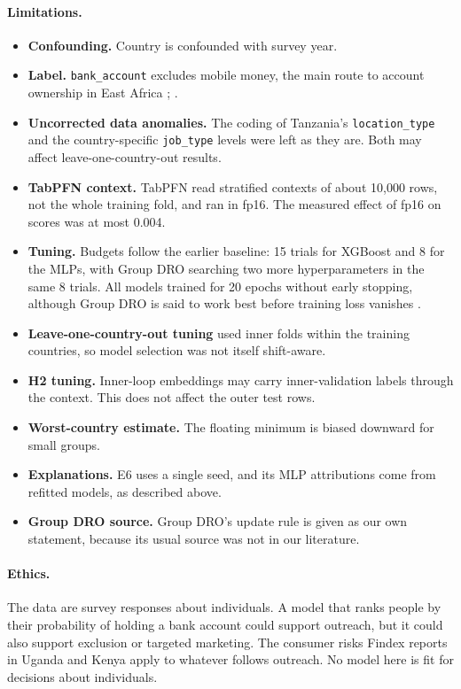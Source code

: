 \documentclass[11pt]{article}
\begin{document}
\paragraph{Limitations.}
\begin{itemize}
  \item \textbf{Confounding.} Country is confounded with survey year.
  \item \textbf{Label.} \texttt{bank\_account} excludes mobile money, the main route to account ownership in East Africa \citep[p.~20]{demirguckunt2022findex}; \citep{engelmann2018unbanked}.
  \item \textbf{Uncorrected data anomalies.} The coding of Tanzania's \texttt{location\_type} and the country-specific \texttt{job\_type} levels were left as they are. Both may affect leave-one-country-out results.
  \item \textbf{TabPFN context.} TabPFN read stratified contexts of about 10,000 rows, not the whole training fold, and ran in fp16. The measured effect of fp16 on scores was at most 0.004.
  \item \textbf{Tuning.} Budgets follow the earlier baseline: 15 trials for XGBoost and 8 for the MLPs, with Group DRO searching two more hyperparameters in the same 8 trials. All models trained for 20 epochs without early stopping, although Group DRO is said to work best before training loss vanishes \citep[p.~67]{koh2021wilds}.
  \item \textbf{Leave-one-country-out tuning} used inner folds within the training countries, so model selection was not itself shift-aware.
  \item \textbf{H2 tuning.} Inner-loop embeddings may carry inner-validation labels through the context. This does not affect the outer test rows.
  \item \textbf{Worst-country estimate.} The floating minimum is biased downward for small groups.
  \item \textbf{Explanations.} E6 uses a single seed, and its MLP attributions come from refitted models, as described above.
  \item \textbf{Group DRO source.} Group DRO's update rule is given as our own statement, because its usual source was not in our literature.
\end{itemize}

\paragraph{Ethics.} The data are survey responses about individuals. A model that ranks people by their probability of holding a bank account could support outreach, but it could also support exclusion or targeted marketing. The consumer risks Findex reports in Uganda and Kenya \citep[pp.~150, 172]{demirguckunt2022findex} apply to whatever follows outreach. No model here is fit for decisions about individuals.
\end{document}
